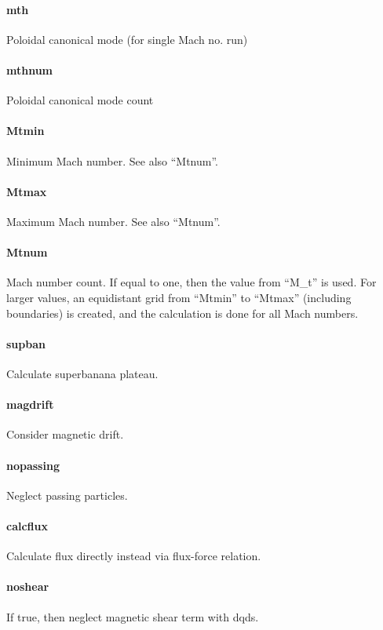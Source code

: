\paragraph{mth}
Poloidal canonical mode (for single Mach no. run)

\paragraph{mthnum}
Poloidal canonical mode count

\paragraph{Mtmin}
Minimum Mach number. See also ``Mtnum''.

\paragraph{Mtmax}
Maximum Mach number. See also ``Mtnum''.

\paragraph{Mtnum}
Mach number count. If equal to one, then the value from ``M\_t'' is
used. For larger values, an equidistant grid from ``Mtmin'' to ``Mtmax''
(including boundaries) is created, and the calculation is done for all
Mach numbers.

\paragraph{supban}
Calculate superbanana plateau.

\paragraph{magdrift}
Consider magnetic drift.

\paragraph{nopassing}
Neglect passing particles.

\paragraph{calcflux}
Calculate flux directly instead via flux-force relation.

\paragraph{noshear}
If true, then neglect magnetic shear term with dqds.

